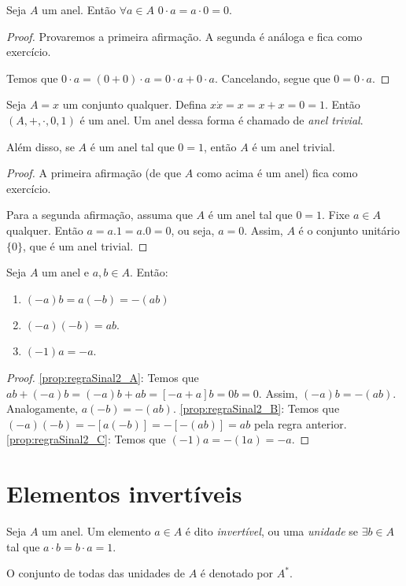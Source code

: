 \begin{prop}
    Seja $A$ um anel. Então $\forall a \in A$ $0 \cdot a = a \cdot 0 = 0$.
\end{prop}
\begin{proof}
Provaremos a primeira afirmação. A segunda é análoga e fica como exercício.

Temos que $0\cdot a=(0+0)\cdot a=0\cdot a +0\cdot a$. Cancelando, segue que $0=0\cdot a$.
\end{proof}

\begin{prop}
    Seja $A={x}$ um conjunto qualquer. Defina $x\dot x=x=x+x=0=1$. Então $(A, +, \cdot, 0, 1)$ é um anel. Um anel dessa forma é chamado de \emph{anel trivial}.
    
    Além disso, se $A$ é um anel tal que $0=1$, então $A$ é um anel trivial.
\end{prop}
\begin{proof}
    A primeira afirmação (de que $A$ como acima é um anel) fica como exercício.

    Para a segunda afirmação, assuma que $A$ é um anel tal que $0=1$. Fixe $a \in A$ qualquer. Então $a=a.1=a.0=0$, ou seja, $a=0$. Assim, $A$ é o conjunto unitário $\{0\}$, que é um anel trivial.
\end{proof}

\begin{prop}\label{prop:regraSinal2}
    Seja $A$ um anel e $a, b \in A$. Então:
    \begin{enumerate}[label=\alph*)]
        \item $(-a)b=a(-b)=-(ab)$\label{prop:regraSinal2_A}
        \item $(-a)(-b)=ab$.\label{prop:regraSinal2_B}
        \item $(-1)a=-a$.\label{prop:regraSinal2_C}
    \end{enumerate}
\end{prop}
\begin{proof}
    \ref{prop:regraSinal2_A}: Temos que $ab+(-a)b=(-a)b+ab=[-a+a]b=0b=0$. Assim, $(-a)b=-(ab)$. Analogamente, $a(-b)=-(ab)$.
    \ref{prop:regraSinal2_B}: Temos que $(-a)(-b)=-[a(-b)]=-[-(ab)]=ab$ pela regra anterior.
    \ref{prop:regraSinal2_C}: Temos que $(-1)a=-(1a)=-a$.

\end{proof}

\section{Elementos invertíveis}
\begin{definition}
    Seja $A$ um anel. Um elemento $a \in A$ é dito \emph{invertível}, ou uma \emph{unidade} se $\exists b \in A$ tal que $a \cdot b = b \cdot a = 1$.
    
    O conjunto de todas das unidades de $A$ é denotado por $A^*$.
\end{definition}

